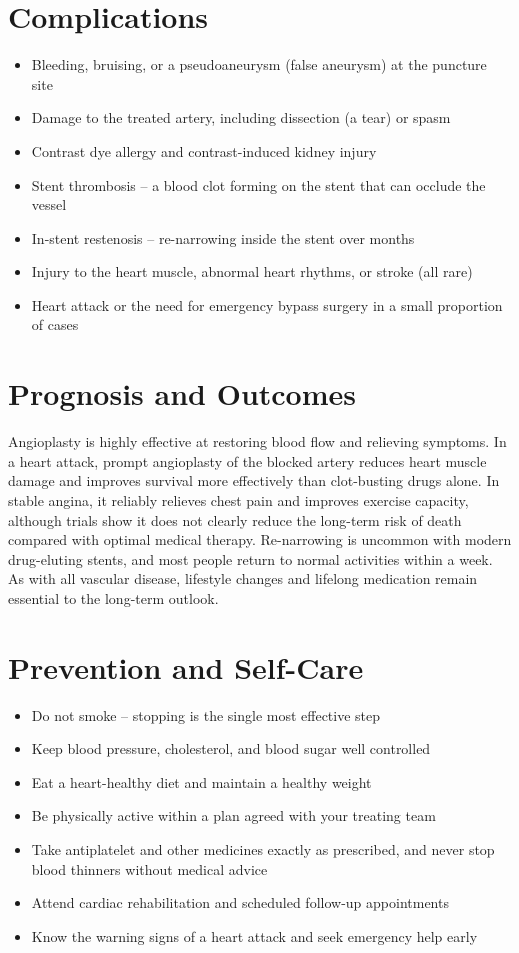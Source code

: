 \section*{Complications}
\begin{itemize}
    \item Bleeding, bruising, or a pseudoaneurysm (false aneurysm) at the puncture site
    \item Damage to the treated artery, including dissection (a tear) or spasm
    \item Contrast dye allergy and contrast-induced kidney injury
    \item Stent thrombosis -- a blood clot forming on the stent that can occlude the vessel
    \item In-stent restenosis -- re-narrowing inside the stent over months
    \item Injury to the heart muscle, abnormal heart rhythms, or stroke (all rare)
    \item Heart attack or the need for emergency bypass surgery in a small proportion of cases
\end{itemize}

\section*{Prognosis and Outcomes}
Angioplasty is highly effective at restoring blood flow and relieving symptoms. In a heart attack, prompt angioplasty of the blocked artery reduces heart muscle damage and improves survival more effectively than clot-busting drugs alone. In stable angina, it reliably relieves chest pain and improves exercise capacity, although trials show it does not clearly reduce the long-term risk of death compared with optimal medical therapy. Re-narrowing is uncommon with modern drug-eluting stents, and most people return to normal activities within a week. As with all vascular disease, lifestyle changes and lifelong medication remain essential to the long-term outlook.

\section*{Prevention and Self-Care}
\begin{itemize}
    \item Do not smoke -- stopping is the single most effective step
    \item Keep blood pressure, cholesterol, and blood sugar well controlled
    \item Eat a heart-healthy diet and maintain a healthy weight
    \item Be physically active within a plan agreed with your treating team
    \item Take antiplatelet and other medicines exactly as prescribed, and never stop blood thinners without medical advice
    \item Attend cardiac rehabilitation and scheduled follow-up appointments
    \item Know the warning signs of a heart attack and seek emergency help early
\end{itemize}

